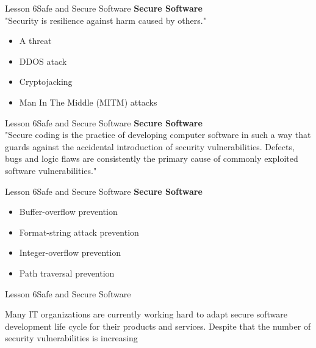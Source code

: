 \documentclass[aspectratio=1610]{beamer}
\begin{document}
\begin{frame}{Lesson 6}{Safe and Secure Software}
\LARGE
\textbf{Secure Software}\\
"Security is resilience against harm caused by others."
\begin{itemize}
    \item A threat
    \item DDOS atack
    \item Cryptojacking
    \item Man In The Middle (MITM) attacks
\end{itemize}
\end{frame}


\begin{frame}{Lesson 6}{Safe and Secure Software}
\LARGE
\textbf{Secure Software}\\
"Secure coding is the practice of developing computer software in such a way that 
guards against the accidental introduction of security vulnerabilities. Defects, bugs 
and logic flaws are consistently the primary cause of commonly exploited software 
vulnerabilities."
\end{frame}


\begin{frame}{Lesson 6}{Safe and Secure Software}
\LARGE
\textbf{Secure Software}\\
\begin{itemize}
	\item Buffer-overflow prevention
	\item Format-string attack prevention
	\item Integer-overflow prevention
	\item Path traversal prevention
\end{itemize}
\end{frame}



\begin{frame}{Lesson 6}{Safe and Secure Software}
\Huge
\begin{center}
Many IT organizations are currently working hard to adapt secure software development
life cycle for their products and services. Despite that the number of security
vulnerabilities is increasing
\end{center}
\end{frame}






\end{document}
